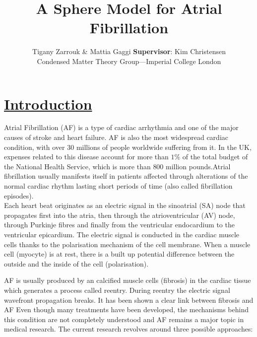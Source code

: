 \documentclass[twocolumn, a1paper]{article}
\begin{document}
\title {\textbf{ A Sphere Model for Atrial Fibrillation}}
\author{Tigany Zarrouk \& Mattia Gaggi \textbf{Supervisor}: Kim Christensen \\ Condensed Matter Theory Group---Imperial College London}

\date{}
\maketitle






\section{\textbf{\underline{Introduction}}}

Atrial Fibrillation (AF) is a type of cardiac arrhythmia and one of the major causes of stroke and heart failure. AF is also the most widespread cardiac condition, with over 30 millions of people worldwide suffering from it. In the UK, expenses related to this disease account for more than $1\%$ of the total budget of the National Health Service, which is more than $800$ million pounds.Atrial fibrillation usually manifests itself in patients affected through alterations of the normal cardiac rhythm lasting short periods of time (also called fibrillation episodes).\\

Each heart beat originates as an electric signal in the sinoatrial (SA) node that propagates first into the atria, then through the atrioventricular (AV) node, through Purkinje fibres and finally from the ventricular endocardium to the ventricular epicardium. The electric signal is conducted in the cardiac muscle cells thanks to the polarisation mechanism of the cell membrane. 
When a muscle cell (myocyte) is at rest, there is a built up potential difference between the outside and the inside of the cell (polarisation).








AF is usually produced  by an calcified muscle cells (fibrosis) in the cardiac tissue which generates a process called reentry. During reentry the electric signal wavefront propagation breaks. It has been shown a clear link between fibrosis and AF
Even though many treatments have been developed, the mechanisms behind this condition are not completely understood and AF remains a major topic in medical research. The current research revolves around three possible approaches:
\end{document}
